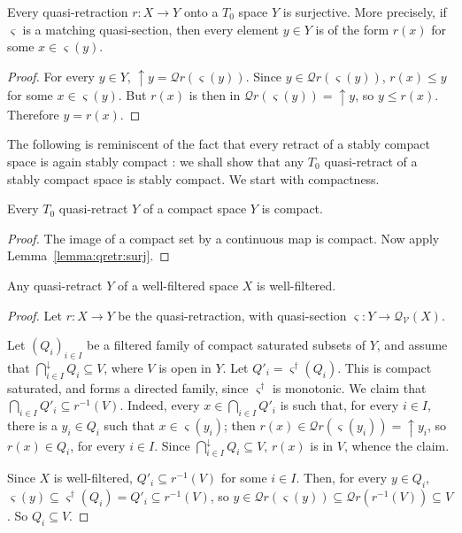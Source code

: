 \documentclass{LMCS}
\newcommand\Smyth{\mathcal Q}
\newcommand\V{{\mathcal V}}
\newcommand\SV{\Smyth_\V}
\newcommand\upc{\mathop{\uparrow}\nolimits}
\newcommand\qs{\varsigma}
\begin{document}
\begin{lem}
  \label{lemma:qretr:surj}
  Every quasi-retraction $r : X \to Y$ onto a $T_0$ space $Y$ is
  surjective.  More precisely, if $\qs$ is a matching quasi-section,
  then every element $y \in Y$ is of the form $r (x)$ for some $x \in
  \qs (y)$.
\end{lem}
\begin{proof}
  For every $y \in Y$, $\upc y = \Smyth r (\qs (y))$.  Since $y \in
  \Smyth r (\qs (y))$, $r (x) \leq y$ for some $x \in \qs (y)$.  But
  $r (x)$ is then in $\Smyth r (\qs (y)) = \upc y$, so $y \leq r (x)$.
  Therefore $y = r (x)$.
\end{proof}

The following is reminiscent of the fact that every retract of a
stably compact space is again stably compact \cite[Proposition, bottom
of p.153, and subsequent discussion]{Lawson:versatile}: we shall show
that any $T_0$ quasi-retract of a stably compact space is stably
compact.  We start with compactness.
\begin{lem}
  \label{lemma:qretr:comp}
  Every $T_0$ quasi-retract $Y$ of a compact space $Y$ is compact.
\end{lem}
\begin{proof}
  The image of a compact set by a continuous map is compact.  Now
  apply Lemma~\ref{lemma:qretr:surj}.
\end{proof}

\begin{lem}
  \label{lemma:qretr:wf}
  Any quasi-retract $Y$ of a well-filtered space $X$ is well-filtered.
\end{lem}
\begin{proof}
  Let $r : X \to Y$ be the quasi-retraction, with quasi-section $\qs :
  Y \to \SV (X)$.

  Let ${(Q_i)}_{i \in I}$ be a filtered family of compact saturated
  subsets of $Y$, and assume that $\bigcap_{i \in I}^\downarrow Q_i
  \subseteq V$, where $V$ is open in $Y$.  Let $Q'_i = \qs^\dagger
  (Q_i)$.  This is compact saturated, and forms a directed family,
  since $\qs^\dagger$ is monotonic.  We claim that $\bigcap_{i \in I}
  Q'_i \subseteq r^{-1} (V)$.  Indeed, every $x \in \bigcap_{i \in I}
  Q'_i$ is such that, for every $i \in I$, there is a $y_i \in Q_i$
  such that $x \in \qs (y_i)$; then $r (x) \in \Smyth r (\qs (y_i)) =
  \upc {y_i}$, so $r (x) \in Q_i$, for every $i \in I$.  Since
  $\bigcap_{i \in I}^\downarrow Q_i \subseteq V$, $r (x)$ is in $V$,
  whence the claim.

  Since $X$ is well-filtered, $Q'_i \subseteq r^{-1} (V)$ for some $i
  \in I$.  Then, for every $y \in Q_i$, $\qs (y) \subseteq \qs^\dagger
  (Q_i) = Q'_i \subseteq r^{-1} (V)$, so $y \in \Smyth r (\qs (y))
  \subseteq \Smyth r (r^{-1} (V)) \subseteq V$.  So $Q_i \subseteq V$.
\end{proof}
\end{document}
